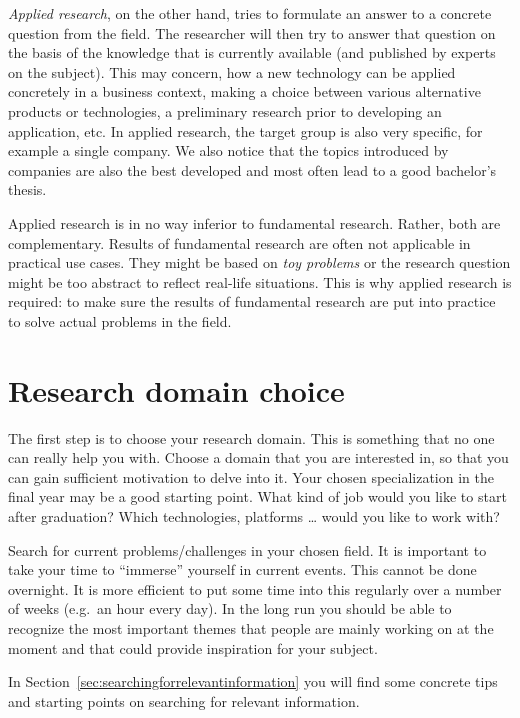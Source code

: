 \emph{Applied research}, on the other hand, tries to formulate an answer to a concrete question from the field. The researcher will then try to answer that question on the basis of the knowledge that is currently available (and published by experts on the subject). This may concern, how a new technology can be applied concretely in a business context, making a choice between various alternative products or technologies, a preliminary research prior to developing an application, etc. In applied research, the target group is also very specific, for example a single company. We also notice that the topics introduced by companies are also the best developed and most often lead to a good bachelor's thesis.

Applied research is in no way inferior to fundamental research. Rather, both are complementary. Results of fundamental research are often not applicable in practical use cases. They might be based on \textit{toy problems} or the research question might be too abstract to reflect real-life situations. This is why applied research is required: to make sure the results of fundamental research are put into practice to solve actual problems in the field.

\section{Research domain choice}
\label{sec:research}

The first step is to choose your research domain. This is something that no one can really help you with. Choose a domain that you are interested in, so that you can gain sufficient motivation to delve into it. Your chosen specialization in the final year may be a good starting point. What kind of job would you like to start after graduation? Which technologies, platforms {\ldots} would you like to work with?

Search for current problems/challenges in your chosen field. It is important to take your time to ``immerse'' yourself in current events. This cannot be done overnight. It is more efficient to put some time into this regularly over a number of weeks (e.g.\ an hour every day). In the long run you should be able to recognize the most important themes that people are mainly working on at the moment and that could provide inspiration for your subject.

In Section~\ref{sec:searchingforrelevantinformation} you will find some concrete tips and starting points on searching for relevant information. 

